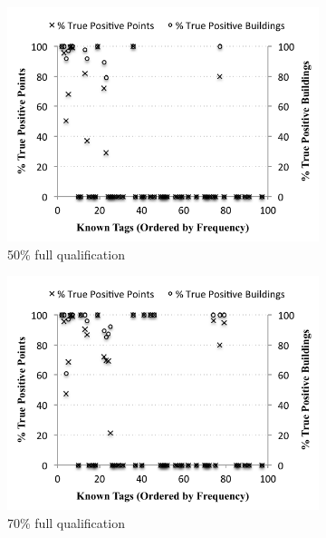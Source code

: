 \begin{figure}[H]
\centering
	\begin{subfigure}{0.4\textwidth}
                \centering
		\includegraphics[width=\textwidth]{./figs/recallCampusWide-50.pdf}
                \caption{50\% full qualification}
	\end{subfigure}
	\begin{subfigure}{0.4\textwidth}
                \centering
		\includegraphics[width=\textwidth]{./figs/recallCampusWide-70.pdf}
                \caption{70\% full qualification}
	\end{subfigure}
	\begin{subfigure}{0.4\textwidth}
                \centering

\end{subfigure}
\end{figure}
